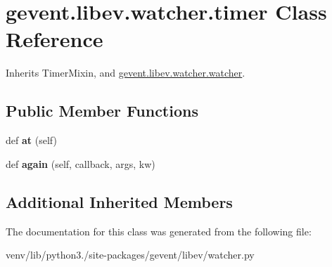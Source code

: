 \hypertarget{classgevent_1_1libev_1_1watcher_1_1timer}{}\section{gevent.\+libev.\+watcher.\+timer Class Reference}
\label{classgevent_1_1libev_1_1watcher_1_1timer}


Inherits Timer\+Mixin, and \hyperlink{classgevent_1_1libev_1_1watcher_1_1watcher}{gevent.\+libev.\+watcher.\+watcher}.

\subsection*{Public Member Functions}
\begin{DoxyCompactItemize}
\item 
\mbox{\label{classgevent_1_1libev_1_1watcher_1_1timer_a510f7969c57b4425f776629211242f19}} 
def {\bfseries at} (self)
\item 
\mbox{\label{classgevent_1_1libev_1_1watcher_1_1timer_a4776e56ae7241b486a10407aef47149a}} 
def {\bfseries again} (self, callback, args, kw)
\end{DoxyCompactItemize}
\subsection*{Additional Inherited Members}


The documentation for this class was generated from the following file\+:\begin{DoxyCompactItemize}
\item 
venv/lib/python3./site-\/packages/gevent/libev/watcher.\+py\end{DoxyCompactItemize}
